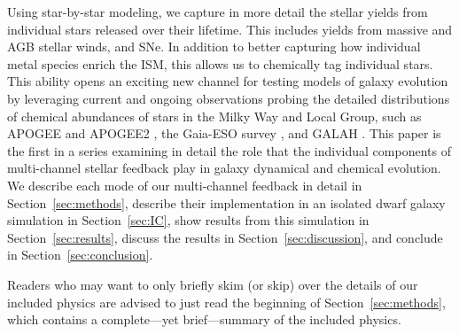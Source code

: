 \documentclass[twocolumn]{aastex61}
\begin{document}
Using star-by-star modeling, we capture in more detail the stellar yields from individual stars released over their lifetime. This includes yields from massive and AGB stellar winds, and SNe. In addition to better capturing how individual metal species enrich the ISM, this allows us to chemically tag individual stars. This ability opens an exciting new channel for testing models of galaxy evolution by leveraging current and ongoing observations probing the detailed distributions of chemical abundances of stars in the Milky Way and Local Group, such as APOGEE and APOGEE2 \citep{APOGEE2010,APOGEE}, the Gaia-ESO survey \citep{Gaia}, and GALAH \citep{GALAH}. This paper is the first in a series examining in detail the role that the individual components of multi-channel stellar feedback play in galaxy dynamical and chemical evolution. We describe each mode of our multi-channel feedback 
in detail in Section~\ref{sec:methods}, describe their implementation in an isolated dwarf galaxy simulation in Section~\ref{sec:IC}, show results from this simulation in Section~\ref{sec:results}, discuss the results in Section~\ref{sec:discussion}, and conclude in Section~\ref{sec:conclusion}.

Readers who may want to only briefly skim (or skip) over the details of our included physics are advised to just read the beginning of Section~\ref{sec:methods}, which contains a complete---yet brief---summary of the included physics.
\end{document}
